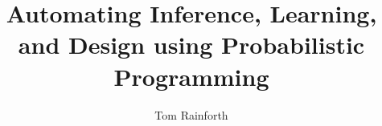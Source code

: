 
\correctionstrue

\usepackage{natbib}

\renewcommand*{\bibfont}{\small}
\setlength{\bibsep}{2pt}

\title{Automating Inference, Learning, and Design using Probabilistic Programming}
\author{Tom Rainforth}


\usepackage{microtype}

\usepackage{times}
\usepackage{graphicx} %
\usepackage{subcaption} 
\graphicspath{{./part/ipmcmc/figures/}{./misc/figures/}{./bopp/figures/}{./opt/figures/}{./design/figures/}{./nest/figures/}{./inf/figures/}{./part/figures/}{./bayes/figures/}{./probprog/figures/}{./part/figures/}}
\usepackage{tikz}
\usetikzlibrary{fit}					%
\usetikzlibrary{backgrounds}	%
\usepackage{setspace}

\usepackage{cancel}




\usepackage{amsthm}
\usepackage{dsfont}
\usepackage{amssymb,amsmath}
\usepackage{bbm}


\usepackage{hyperref}

